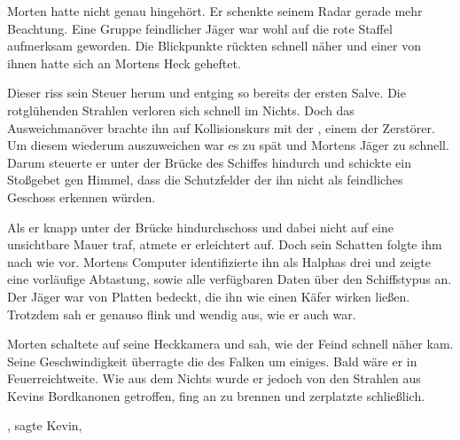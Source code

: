 Morten hatte nicht genau hingehört. Er schenkte seinem Radar gerade mehr Beachtung. Eine Gruppe feindlicher Jäger war wohl auf die rote Staffel aufmerksam geworden. Die Blickpunkte rückten schnell näher und einer von ihnen hatte sich an Mortens Heck geheftet.

\par

Dieser riss sein Steuer herum und entging so bereits der ersten Salve. Die rotglühenden Strahlen verloren sich schnell im Nichts. Doch das Ausweichmanöver brachte ihn auf Kollisionskurs mit der , einem der Zerstörer. Um diesem wiederum auszuweichen war es zu spät und Mortens Jäger zu schnell. Darum steuerte er unter der Brücke des Schiffes hindurch und schickte ein Stoßgebet gen Himmel, dass die Schutzfelder der  ihn nicht als feindliches Geschoss erkennen würden.

\par

Als er knapp unter der Brücke hindurchschoss und dabei nicht auf eine unsichtbare Mauer traf, atmete er erleichtert auf. Doch sein Schatten folgte ihm nach wie vor. Mortens Computer identifizierte ihn als Halphas drei und zeigte eine vorläufige Abtastung, sowie alle verfügbaren Daten über den Schiffstypus an. Der Jäger war von Platten bedeckt, die ihn wie einen Käfer wirken ließen. Trotzdem sah er genauso flink und wendig aus, wie er auch war.

\par

Morten schaltete auf seine Heckkamera und sah, wie der Feind schnell näher kam. Seine Geschwindigkeit überragte die des Falken um einiges. Bald wäre er in Feuerreichtweite. Wie aus dem Nichts wurde er jedoch von den Strahlen aus Kevins Bordkanonen getroffen, fing an zu brennen und zerplatzte schließlich.

\par

, sagte Kevin, 
